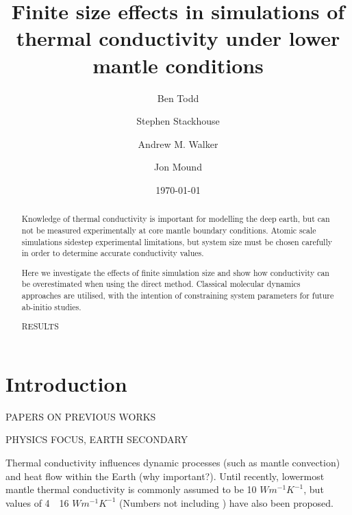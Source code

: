\documentclass[%
preprint,                                  %
nofootinbib,
 amsmath,amssymb,
 aps,
]{revtex4-1}
\begin{document}
\newcommand{\wmk}{$Wm^{-1}K^{-1}$}


\title{Finite size effects in simulations of thermal conductivity under lower mantle conditions}%

\author{Ben Todd}
\author{Stephen Stackhouse}
\author{Andrew M. Walker}
\author{Jon Mound}


\date{\today}%

\begin{abstract}
Knowledge of thermal conductivity is important for modelling the deep earth, but can not be measured experimentally at core mantle boundary conditions. Atomic scale simulations sidestep experimental limitations, but system size must be chosen carefully in order to determine accurate conductivity values.

Here we investigate the effects of finite simulation size and show how conductivity can be overestimated when using the direct method.
Classical molecular dynamics approaches are utilised, with the intention of constraining system parameters for future ab-initio studies.

RESULTS
\end{abstract}

\maketitle




\section{\label{sec:intro}Introduction}

PAPERS ON PREVIOUS WORKS

PHYSICS FOCUS, EARTH SECONDARY

Thermal conductivity influences dynamic processes (such as mantle convection) and heat flow within the Earth (why important?). Until recently, lowermost mantle thermal conductivity is commonly assumed to be 10 \wmk \cite{Lay2008}, but values of 4~\textemdash~16 \wmk \cite{Goncharov2009,Lay2008,Hofmeister1999,Brown1986} (Numbers not including \citet{Manthilake2011a}) have also been proposed. 
\end{document}

